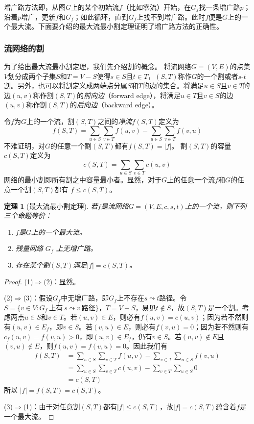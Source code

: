 \documentclass[a4paper]{ctexbook}
\newtheorem{theorem}{定理}[chapter] %
\begin{document}
  增广路方法即，从图$G$上的某个初始流$f$（比如零流）开始，在$G_f$找一条增广路$p$；沿着$p$增广，更新$f$和$G_f$；如此循环，直到$G_f$上找不到增广路。此时$f$便是$G$上的一个最大流。下面要介绍的最大流最小割定理证明了增广路方法的正确性。
  \subsubsection*{流网络的割}
  为了给出最大流最小割定理，我们先介绍割的概念。
  将流网络$G=(V,E)$的点集$V$划分成两个子集$S$和$T=V-S$使得$s\in S$且$t\in T$，$(S,T)$称作$G$的一个割或者$s$-$t$割。另外，也可以将割定义成两端点分属$S$和$T$的边的集合。将满足$u\in S$且$v\in T$的边$(u,v)$称作割$(S,T)$的\emph{前向边}（forward edge），将满足$u\in T$且$v\in S$的边$(u,v)$称作割$(S,T)$的\emph{后向边}（backward edge）。

  令$f$为$G$上的一个流，割$(S,T)$之间的\emph{净流}$f(S,T)$定义为
  \[
  f(S,T) = \sum_{u\in S}\sum_{v\in T}f(u,v) - \sum_{u\in S}\sum_{v\in T}f(v,u)
  \]
  不难证明，对$G$的任意一个割$(S,T)$都有$f(S,T) = |f|$。
  割$(S,T)$的容量$c(S,T)$定义为
  \[
  c(S,T) = \sum_{u\in S}\sum_{v\in T}c(u,v)
  \]
  网络的最小割即所有割之中容量最小者。显然，对于$G$上的任意一个流$f$和$G$的任意一个割$(S,T)$都有 $f \le c(S,T)$。
  \begin{theorem}[最大流最小割定理]
    若$f$是流网络$G=(V,E,c,s,t)$上的一个流，则下列三个命题等价：
    \begin{enumerate}
      \item $f$是$G$上的一个最大流。
      \item 残量网络 $G_f$ 上无增广路。
      \item 存在某个割$(S,T)$满足$|f| = c(S,T)$。
    \end{enumerate}
  \end{theorem}
  \begin{proof}
    (1)$\Rightarrow$(2)：显然。

    (2)$\Rightarrow$(3)：假设$G_f$中无增广路，即$G_f$上不存在$s\leadsto t$路径。令$S=\{v\in V\colon G_f\ \text{上有}\ s\leadsto v\ \text{路径}\}$，$T=V-S$，易见$t\notin S$，故$(S,T)$是一个割。考虑两点$u\in S$和$v\in T$。若$(u,v)\in E$，则必有$f(u,v)=c(u,v)$；因为若不然则有$(u,v)\in E_f$，即$v\in S$。若$(v,u)\in E$，则必有$f(v,u)=0$；因为若不然则有$c_f(u,v) = f(v,u) > 0$，即$(u,v)\in E_f$，仍有$v \in S$。若$(u,v)\notin E$且$(v,u)\notin E$，则$f(u,v)=f(v,u)=0$。因此我们有
    \begin{align*}
        f(S,T) &= \sum_{u\in S}\sum_{v\in T}f(u,v) - \sum_{v\in T}\sum_{u\in S}f(v,u)\\
        &= \sum_{u\in S}\sum_{v\in T}c(u,v) - \sum_{v\in T}\sum_{u\in S}0\\
        &= c(S, T)
    \end{align*}
    所以 $|f| = f(S,T) = c(S, T)$。

    (3)$\Rightarrow$(1)：由于对任意割$(S,T)$都有$|f|\le c(S,T)$，故$|f|=c(S,T)$蕴含着$f$是一个最大流。
  \end{proof}
\end{document}
